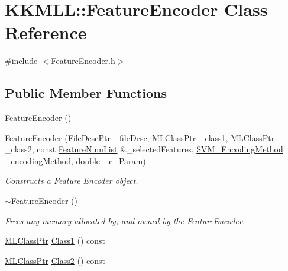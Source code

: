 \hypertarget{class_k_k_m_l_l_1_1_feature_encoder}{}\section{K\+K\+M\+LL\+:\+:Feature\+Encoder Class Reference}
\label{class_k_k_m_l_l_1_1_feature_encoder}


{\ttfamily \#include $<$Feature\+Encoder.\+h$>$}

\subsection*{Public Member Functions}
\begin{DoxyCompactItemize}
\item 
\hyperlink{class_k_k_m_l_l_1_1_feature_encoder_afaf2be970998ea6430e5d17ea95d80a7}{Feature\+Encoder} ()
\item 
\hyperlink{class_k_k_m_l_l_1_1_feature_encoder_a3dafb5bf818bb9f7485b19b7f761f878}{Feature\+Encoder} (\hyperlink{namespace_k_k_m_l_l_aa0d0b6ab4ec18868a399b8455b05d914}{File\+Desc\+Ptr} \+\_\+file\+Desc, \hyperlink{namespace_k_k_m_l_l_ac272393853d59e72e8456f14cd6d8c23}{M\+L\+Class\+Ptr} \+\_\+class1, \hyperlink{namespace_k_k_m_l_l_ac272393853d59e72e8456f14cd6d8c23}{M\+L\+Class\+Ptr} \+\_\+class2, const \hyperlink{class_k_k_m_l_l_1_1_feature_num_list}{Feature\+Num\+List} \&\+\_\+selected\+Features, \hyperlink{namespace_k_k_m_l_l_a1994af1d94ca5bf6e27f0cf803a8d64c}{S\+V\+M\+\_\+\+Encoding\+Method} \+\_\+encoding\+Method, double \+\_\+c\+\_\+\+Param)
\begin{DoxyCompactList}\small\item\em Constructs a Feature Encoder object. \end{DoxyCompactList}\item 
\hyperlink{class_k_k_m_l_l_1_1_feature_encoder_a631274626b3d882a9c09ba7ff1950dea}{$\sim$\+Feature\+Encoder} ()
\begin{DoxyCompactList}\small\item\em Frees any memory allocated by, and owned by the \hyperlink{class_k_k_m_l_l_1_1_feature_encoder}{Feature\+Encoder}. \end{DoxyCompactList}\item 
\hyperlink{namespace_k_k_m_l_l_ac272393853d59e72e8456f14cd6d8c23}{M\+L\+Class\+Ptr} \hyperlink{class_k_k_m_l_l_1_1_feature_encoder_a397e19999f5572120b55038835614162}{Class1} () const 
\item 
\hyperlink{namespace_k_k_m_l_l_ac272393853d59e72e8456f14cd6d8c23}{M\+L\+Class\+Ptr} \hyperlink{class_k_k_m_l_l_1_1_feature_encoder_a70eb189a61d27c7c513085274a7edd75}{Class2} () const 

\end{DoxyCompactItemize}
